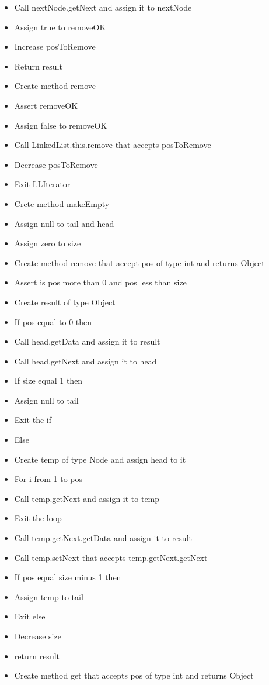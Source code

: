 \begin{itemize}
	\item Call nextNode.getNext and assign it to nextNode
	\item Assign true to removeOK
	\item Increase posToRemove
	\item Return result
	\item Create method remove
	\item Assert removeOK
	\item Assign false to removeOK
	\item Call LinkedList.this.remove that accepts posToRemove
	\item Decrease posToRemove
	\item Exit LLIterator
	\item Crete method makeEmpty
	\item Assign null to tail and head
	\item Assign zero to size
	\item Create method remove that accept pos of type int and returns Object
	\item Assert is pos more than 0 and pos less than size
	\item Create result of type Object
	\item If pos equal to 0 then
	\item Call head.getData and assign it to result
	\item Call head.getNext and assign it to head
	\item If size equal 1 then
	\item Assign null to tail
	\item Exit the if
	\item Else
	\item Create temp of type Node and assign head to it
	\item For i from 1 to pos
	\item Call temp.getNext and assign it to temp
	\item Exit the loop
	\item Call temp.getNext.getData and assign it to result
	\item Call temp.setNext that accepts temp.getNext.getNext
	\item If pos equal size minus 1 then
	\item Assign temp to tail
	\item Exit else
	\item Decrease size
	\item return result
	\item Create method get that accepts pos of type int and returns Object

\end{itemize}
